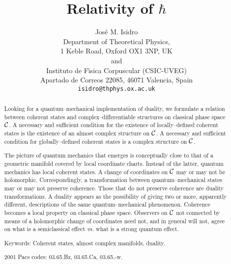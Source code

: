 \documentclass[a4paper,a4paper]{article}
\begin{document}
\title{Relativity of $\hbar$}
\author{Jos\'e M. Isidro \\ 
Department of Theoretical Physics,\\ 
1 Keble Road, Oxford OX1 3NP, UK\\ 
and\\
Instituto de F\'{\i}sica Corpuscular (CSIC-UVEG)\\
Apartado de Correos 22085, 46071 Valencia, Spain\\
{\tt isidro@thphys.ox.ac.uk}}
\maketitle

\begin{abstract}

Looking for a quantum--mechanical implementation of duality,
we formulate a relation between coherent states and complex--differentiable 
structures on classical phase space ${\cal C}$. 
A necessary and sufficient condition for the existence of 
locally--defined coherent states is the existence of an almost complex 
structure on ${\cal C}$. A necessary and sufficient condition 
for globally--defined coherent states is a complex structure on ${\cal C}$.  

The picture of quantum mechanics that emerges is conceptually close to that of a 
geometric manifold covered by local coordinate charts. Instead of the 
latter, quantum mechanics has local coherent states. A change of 
coordinates on ${\cal C}$ may or may not be holomorphic. Correspondingly, 
a transformation between quantum--mechanical states may or may not preserve 
coherence. Those that do not preserve coherence are duality 
transformations. A duality appears as the possibility of giving 
two or more, apparently different, descriptions 
of the same quantum--mechanical phenomenon.
Coherence becomes a local property on classical phase space. 
Observers on ${\cal C}$ not connected by means of a holomorphic change of 
coordinates need not, and in general will not, agree on what is a semiclassical 
effect {\it vs.} what is a strong quantum effect. 

Keywords: Coherent states, almost complex manifolds, duality.

2001 Pacs codes: 03.65.Bz, 03.65.Ca, 03.65.-w.


\end{abstract}


\tableofcontents
\end{document}
